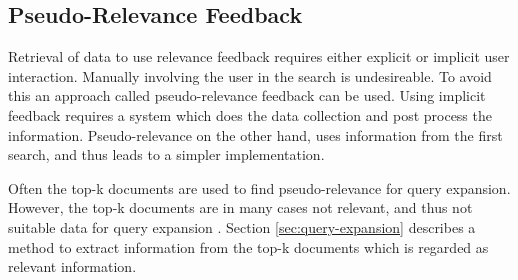 \subsection{Pseudo-Relevance Feedback}
Retrieval of data to use relevance feedback requires either explicit or implicit user interaction.
Manually involving the user in the search is undesireable.
To avoid this an approach called pseudo-relevance feedback can be used.
Using implicit feedback requires a system which does the data collection and post process the information.
Pseudo-relevance on the other hand, uses information from the first search, and thus leads to a simpler implementation.

Often the top-k documents are used to find pseudo-relevance for query expansion.
However, the top-k documents are in many cases not relevant, and thus not suitable data for query expansion \cite{pseudo-relevance-invalid}.
Section \ref{sec:query-expansion} describes a method to extract information from the top-k documents which is regarded as relevant information.
